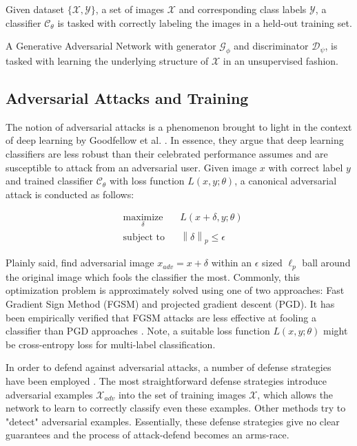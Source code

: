 \documentclass[twoside]{article}
\theoremstyle{definition}
\newcommand{\norm}[2]{\left\lVert #1 \right\rVert_{#2}}
\begin{document}
Given dataset $\{\mathcal{X},\mathcal{Y}\}$, a set of images $\mathcal{X}$ and corresponding
class labels $\mathcal{Y}$, a classifier $\mathcal{C}_{\theta}$ is tasked with correctly labeling the 
images in a held-out training set.

A Generative Adversarial Network with generator $\mathcal{G}_{\phi}$ and discriminator $\mathcal{D}_{\psi}$, 
is tasked with learning the underlying structure of $\mathcal{X}$ in an unsupervised fashion. 
\fi

\subsection{Adversarial Attacks and Training}
The notion of adversarial attacks is a phenomenon brought to light in the context of deep learning by Goodfellow et al. \cite{2014arXiv1412.6572G}. In essence,
they argue that deep learning classifiers are less robust than their celebrated performance assumes and are susceptible to attack from an adversarial user.
Given image $x$ with correct label $y$ and trained classifier $\mathcal{C_{\theta}}$ with loss function
$L(x,y;\theta)$, a canonical adversarial attack is conducted as follows:

\begin{equation*}
\begin{aligned}
& \underset{\delta}{\text{maximize}}
& & L(x+\delta,y;\theta) \\
& \text{subject to}
& & \norm{\delta}{p} \leq \epsilon
\end{aligned}
\end{equation*}

Plainly said, find adversarial image $x_{adv} = x + \delta$ within an $\epsilon$ sized $\ell_p$ ball around the
original image which fools the classifier the most. Commonly, this optimization problem is approximately solved using
one of two approaches: Fast Gradient Sign Method (FGSM) and projected gradient descent (PGD). It has been empirically
verified that FGSM attacks are less effective at fooling a classifier than PGD approaches \cite{madry}. Note, a suitable
loss function $L(x,y;\theta)$ might be cross-entropy loss for multi-label classification. 


In order to defend against adversarial attacks, a number of defense strategies have been employed \cite{2018arXiv180200420A}.
The most straightforward defense strategies introduce adversarial examples $\mathcal{X}_{adv}$ into the set of training images
$\mathcal{X}$, which allows the network to learn to correctly classify even these examples. Other methods try to 
"detect" adversarial examples. Essentially, these defense strategies give no clear guarantees and the process of
attack-defend becomes an arms-race. 
\end{document}
